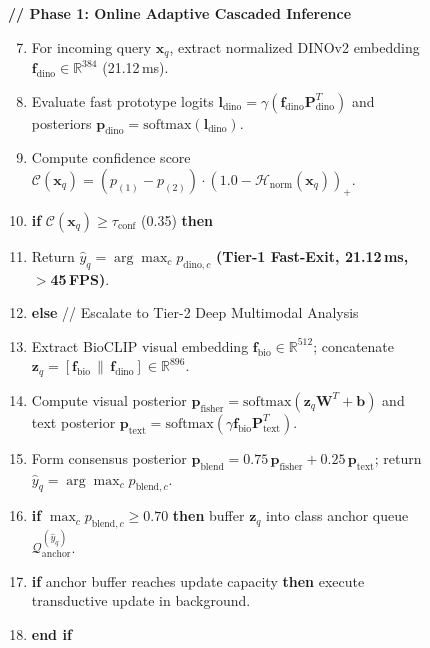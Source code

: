 \documentclass[a4paper,fleqn,nologo]{cas-dc}
\begin{document}
\begin{figure}[htbp]
{\begin{minipage}{0.95\textwidth}
\vspace{2pt}
\textbf{// Phase 1: Online Adaptive Cascaded Inference}
\begin{enumerate}
    \setcounter{enumi}{6}
    \setlength{\itemsep}{1pt}
    \item For incoming query $\mathbf{x}_q$, extract normalized DINOv2 embedding $\mathbf{f}_{\text{dino}} \in \mathbb{R}^{384}$ (21.12\,ms).
    \item Evaluate fast prototype logits $\mathbf{l}_{\text{dino}} = \gamma (\mathbf{f}_{\text{dino}}\mathbf{P}_{\text{dino}}^T)$ and posteriors $\mathbf{p}_{\text{dino}} = \text{softmax}(\mathbf{l}_{\text{dino}})$.
    \item Compute confidence score $\mathcal{C}(\mathbf{x}_q) = (p_{(1)} - p_{(2)}) \cdot (1.0 - \mathcal{H}_{\text{norm}}(\mathbf{x}_q))_+$.
    \item \textbf{if} $\mathcal{C}(\mathbf{x}_q) \ge \tau_{\text{conf}}$ (0.35) \textbf{then}
    \item \quad Return $\hat{y}_q = \arg\max_c p_{\text{dino}, c}$ \textbf{(Tier-1 Fast-Exit, 21.12\,ms, $>$45\,FPS)}.
    \item \textbf{else} // Escalate to Tier-2 Deep Multimodal Analysis
    \item \quad Extract BioCLIP visual embedding $\mathbf{f}_{\text{bio}} \in \mathbb{R}^{512}$; concatenate $\mathbf{z}_q = [\mathbf{f}_{\text{bio}} \,\|\, \mathbf{f}_{\text{dino}}] \in \mathbb{R}^{896}$.
    \item \quad Compute visual posterior $\mathbf{p}_{\text{fisher}} = \text{softmax}(\mathbf{z}_q \mathbf{W}^T + \mathbf{b})$ and text posterior $\mathbf{p}_{\text{text}} = \text{softmax}(\gamma \mathbf{f}_{\text{bio}}\mathbf{P}_{\text{text}}^T)$.
    \item \quad Form consensus posterior $\mathbf{p}_{\text{blend}} = 0.75 \, \mathbf{p}_{\text{fisher}} + 0.25 \, \mathbf{p}_{\text{text}}$; return $\hat{y}_q = \arg\max_c p_{\text{blend}, c}$.
    \item \quad \textbf{if} $\max_c p_{\text{blend}, c} \ge 0.70$ \textbf{then} buffer $\mathbf{z}_q$ into class anchor queue $\mathcal{Q}_{\text{anchor}}^{(\hat{y}_q)}$.
    \item \quad \textbf{if} anchor buffer reaches update capacity \textbf{then} execute transductive update in background.
    \item \textbf{end if}
\end{enumerate}
\vspace{2pt}
\end{minipage}
}
\label{alg:biodino}
\end{figure}
\end{document}
